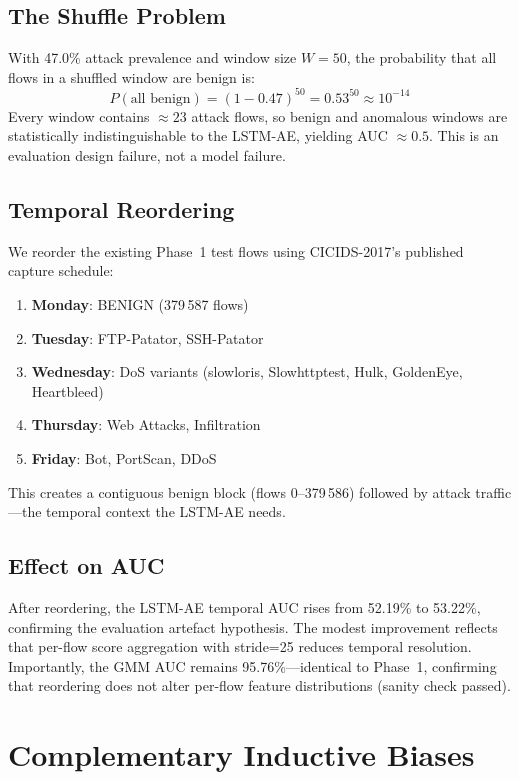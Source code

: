 \documentclass[conference]{IEEEtran}
\begin{document}
\subsection{The Shuffle Problem}

With 47.0\% attack prevalence and window size $W=50$, the probability
that all flows in a shuffled window are benign is:
\[
P(\text{all benign}) = (1-0.47)^{50} = 0.53^{50} \approx 10^{-14}
\]
Every window contains $\approx 23$ attack flows, so benign and anomalous
windows are statistically indistinguishable to the LSTM-AE, yielding
AUC $\approx 0.5$.  This is an evaluation design failure, not a model
failure.

\subsection{Temporal Reordering}

We reorder the existing Phase~1 test flows using CICIDS-2017's published
capture schedule:
\begin{enumerate}
  \item \textbf{Monday}: BENIGN (379\,587 flows)
  \item \textbf{Tuesday}: FTP-Patator, SSH-Patator
  \item \textbf{Wednesday}: DoS variants (slowloris, Slowhttptest, Hulk, GoldenEye, Heartbleed)
  \item \textbf{Thursday}: Web Attacks, Infiltration
  \item \textbf{Friday}: Bot, PortScan, DDoS
\end{enumerate}
This creates a contiguous benign block (flows 0--379\,586) followed by
attack traffic---the temporal context the LSTM-AE needs.

\subsection{Effect on AUC}

After reordering, the LSTM-AE temporal AUC rises from 52.19\% to 53.22\%,
confirming the evaluation artefact hypothesis.  The modest improvement
reflects that per-flow score aggregation with stride=25 reduces temporal
resolution.  Importantly, the GMM AUC remains 95.76\%---identical to
Phase~1, confirming that reordering does not alter per-flow feature
distributions (sanity check passed).

\section{Complementary Inductive Biases}
\end{document}
